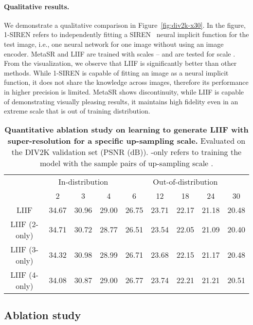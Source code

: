 \documentclass[final]{cvpr}
\begin{document}
\vspace{-1em}
\paragraph{Qualitative results.} We demonstrate a qualitative comparison in Figure~\ref{fig:div2k-x30}. In the figure, 1-SIREN refers to independently fitting a SIREN~\cite{sitzmann2020implicit} neural implicit function for the test image, i.e., one neural network for one image without using an image encoder. MetaSR and LIIF are trained with scales -- and are tested for scale . From the visualization, we observe that LIIF is significantly better than other methods. While 1-SIREN is capable of fitting an image as a neural implicit function, it does not share the knowledge across images, therefore its performance in higher precision is limited. MetaSR shows discontinuity, while LIIF is capable of demonstrating visually pleasing results, it maintains high fidelity even in an extreme  scale that is out of training distribution.

\begin{table*}[]
    \centering
    \begin{tabular}{c|ccc|ccccc}
        & \multicolumn{3}{c|}{In-distribution} & \multicolumn{5}{c}{Out-of-distribution} \\
        & 2 & 3 & 4 & 6 & 12 & 18 & 24 & 30 \\
        \hline
        LIIF & 34.67 & 30.96 & 29.00 & 26.75 & 23.71 & 22.17 & 21.18 & 20.48 \\
        LIIF (2-only) & 34.71 & 30.72 & 28.77 & 26.51 & 23.54 & 22.05 & 21.09 & 20.40 \\
        LIIF (3-only) & 34.32 & 30.98 & 28.99 & 26.71 & 23.68 & 22.15 & 21.17 & 20.48 \\
        LIIF (4-only) & 34.08 & 30.87 & 29.00 & 26.77 & 23.74 & 22.21 & 21.21 & 20.51
    \end{tabular}
    \caption{\textbf{Quantitative ablation study on learning to generate LIIF with super-resolution for a specific up-sampling scale.} Evaluated on the DIV2K validation set (PSNR (dB)). -only refers to training the model with the sample pairs of up-sampling scale .}
    \label{tab:div2k-abl-single-scale}
\end{table*}

\subsection{Ablation study}
\end{document}
